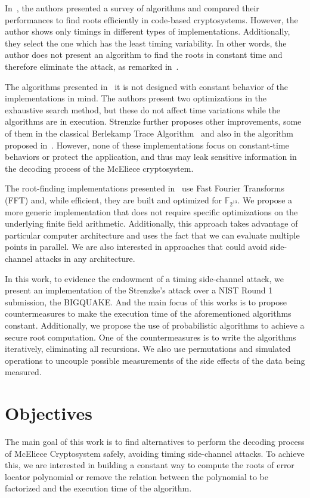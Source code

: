 In~\cite{strenzke2012fast}, the authors presented a survey of algorithms and compared their performances to find roots efficiently in code-based cryptosystems. However, the author shows only timings in different types of implementations. Additionally, they select the one which has the least timing variability. In other words, the author does not present an algorithm to find the roots in constant time and therefore eliminate the attack, as remarked in~\cite{strenzke2013efficiency}.

The algorithms presented in~\cite{strenzke2012fast} it is not designed with constant behavior of the implementations in mind. The authors present two optimizations in the exhaustive search method, but these do not affect time variations while the algorithms are in execution. Strenzke further proposes other improvements, some of them in the classical Berlekamp Trace Algorithm~\cite{berlekamp1970factoring} and also in the algorithm proposed in~\cite{fedorenko2002finding}. However, none of these implementations focus on constant-time behaviors or protect the application, and thus may leak sensitive information in the decoding process of the McEliece cryptosystem.

The root-finding implementations presented in~\cite{chou2017mcbits, bernstein2013mcbits} use Fast Fourier Transforms (FFT) and, while efficient, they are built and optimized for $\mathbb{F}_{2^{13}}$. We propose a more generic implementation that does not require specific optimizations on the underlying finite field arithmetic. Additionally, this approach takes advantage of particular computer architecture and uses the fact that we can evaluate multiple points in parallel. We are also interested in approaches that could avoid side-channel attacks in any architecture. 

In this work, to evidence the endowment of a timing side-channel attack, we present an implementation of the Strenzke's attack over a NIST Round 1 submission, the BIGQUAKE. And the main focus of this works is to propose countermeasures to make the execution time of the aforementioned algorithms constant. Additionally, we propose the use of probabilistic algorithms to achieve a secure root computation. One of the countermeasures is to write the algorithms iteratively, eliminating all recursions. We also use permutations and simulated operations to uncouple possible measurements of the side effects of the data being measured.

\section{Objectives}
The main goal of this work is to find alternatives to perform the decoding process of McEliece Cryptosystem safely, avoiding timing side-channel attacks. To achieve this, we are interested in building a constant way to compute the roots of error locator polynomial or remove the relation between the polynomial to be factorized and the execution time of the algorithm.



